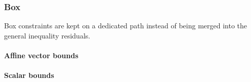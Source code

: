 \documentclass[letterpaper,10pt,english,openany,oneside]{sphinxmanual}
\begin{document}
\begin{sphinxVerbatim}[commandchars=\\\{\}]
        
        
\end{sphinxVerbatim}

\sphinxstepscope


\subsubsection{Box}
\label{\detokenize{api/package/constraints/box:box}}\label{\detokenize{api/package/constraints/box::doc}}
\sphinxAtStartPar
Box constraints are kept on a dedicated path instead of being merged into the general inequality residuals.


\paragraph{Affine vector bounds}
\label{\detokenize{api/package/constraints/box:affine-vector-bounds}}
\begin{sphinxVerbatim}[commandchars=\\\{\}]
       
       
\end{sphinxVerbatim}


\paragraph{Scalar bounds}
\label{\detokenize{api/package/constraints/box:scalar-bounds}}
\begin{sphinxVerbatim}[commandchars=\\\{\}]
     
\end{sphinxVerbatim}
\end{document}
